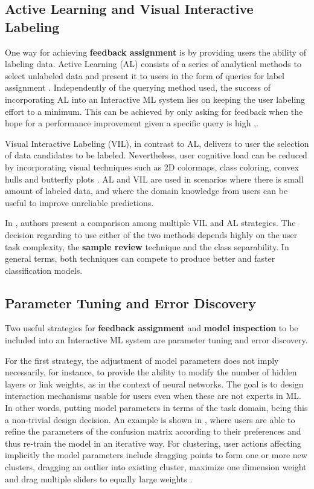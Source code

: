 \subsection{Active Learning and Visual Interactive Labeling}
\label{subsection2.1.2}

One way for achieving \textbf{feedback assignment} is by providing users the ability of labeling data. Active Learning (AL) consists of a series of analytical methods to select unlabeled data and present it to users in the form of queries for label assignment \cite{Holzinger2016}. Independently of the querying method used, the success of incorporating AL into an Interactive ML system lies on keeping the user labeling effort to a minimum. This can be achieved by only asking for feedback when the hope for a performance improvement given a specific query is high \cite{Olsson2009},\cite{Tong2001}.

Visual Interactive Labeling (VIL), in contrast to AL, delivers to user the selection of data candidates to be labeled. Nevertheless, user cognitive load can be reduced by incorporating visual techniques such as 2D colormaps, class coloring, convex hulls and butterfly plots \cite{Bernard2018b}. AL and VIL are used in scenarios where there is small amount of labeled data, and where the domain knowledge from users can be useful to improve unreliable predictions. 

In \cite{Bernard2018b}, authors present a comparison among multiple VIL and AL strategies. The decision regarding to use either of the two methods depends highly on the user task complexity, the \textbf{sample review} technique and the class separability. In general terms, both techniques can compete to produce better and faster classification models.

\subsection{Parameter Tuning and Error Discovery}
\label{subsection2.1.3}

Two useful strategies for \textbf{feedback assignment} and \textbf{model inspection} to be included into an Interactive ML system are parameter tuning and error discovery. 

For the first strategy, the adjustment of model parameters does not imply necessarily, for instance, to provide the ability to modify the number of hidden layers or link weights, as in the context of neural networks. The goal is to design interaction mechanisms usable for users even when these are not experts in ML. In other words, putting model parameters in terms of the task domain, being this a non-trivial design decision. An example is shown in \cite{Kapoor2010}, where users are able to refine the parameters of the confusion matrix according to their preferences and thus re-train the model in an iterative way. For clustering, user actions affecting implicitly the model parameters include dragging points to form one or more new clusters, dragging an outlier into existing cluster, maximize one dimension weight and drag multiple sliders to equally large weights \cite{Self2016}. 

